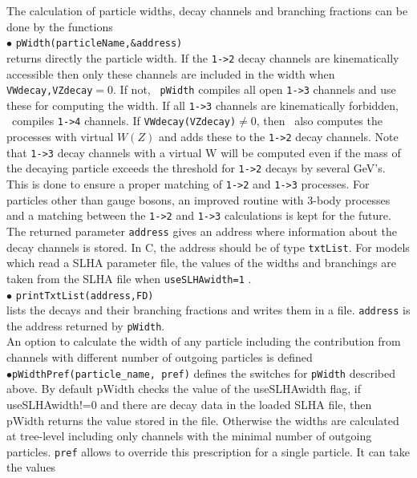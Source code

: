\documentclass[12pt,a4paper]{article}
\begin{document}
The calculation of particle widths, decay channels  and branching fractions
can be done by the functions\\[2mm]
%
\noindent
$\bullet$ \verb|pWidth(particleName,&address)|\\
returns directly the particle width. If the  \verb|1->2| 
decay channels are kinematically accessible then only these channels are
included in the width when \verb|VWdecay,VZdecay|$ = 0$.  If not, {\tt
pWidth} compiles all open \verb|1->3| channels and use these for  computing the width.
If all \verb|1->3| channels are kinematically forbidden, \micro\ compiles \verb|1->4| channels.
If \verb|VWdecay(VZdecay)|$\ne 0$, then \micro\  also computes the processes with virtual $W(Z)$  and adds these to the \verb|1->2| decay channels.
 Note that \verb|1->3| decay channels with a virtual W  will be computed even
if the mass of the decaying particle exceeds the threshold for \verb|1->2| decays by several GeV's. This is done to ensure a 
proper matching of \verb|1->2| and \verb|1->3| processes.  For  particles other than gauge bosons,
an improved routine with 3-body processes and a matching  between
the \verb|1->2| and \verb|1->3| calculations is kept for the future. 
The returned  parameter \verb|address| 
gives  an address where information about the decay channels is stored.
In C, the address should be of type {\tt  txtList}.
For models which read a SLHA parameter file, the values of the widths and branchings are taken from the SLHA
file when \verb|useSLHAwidth=1| .\\[2mm]
%
\noindent
$\bullet$ \verb|printTxtList(address,FD)|\\
lists the decays and their branching fractions and writes them in a file.
{\tt address} is the address returned by {\tt pWidth}. \\[2mm]
%
An option to calculate the width of any particle including the contribution from channels with different number of outgoing particles is defined\\
$\bullet$\verb|pWidthPref(particle_name, pref)|  defines the switches for \verb|pWidth| described above. By default pWidth  checks the value of the  useSLHAwidth flag,  if useSLHAwidth!=0  and  there are decay data  in the loaded SLHA file, then pWidth returns the value stored in the file.  Otherwise the widths are calculated at tree-level including only  channels with the minimal number of outgoing particles. 
\verb|pref| allows to override this prescription for a single particle. It can take the values 
\end{document}
